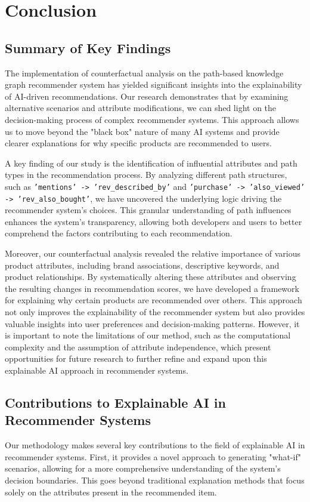 \chapter{Conclusion}\label{chap:conclusion}

\section{Summary of Key Findings}
The implementation of counterfactual analysis on the path-based knowledge graph
recommender system has yielded significant insights into the explainability of
AI-driven recommendations. Our research demonstrates that by examining alternative
scenarios and attribute modifications, we can shed light on the decision-making
process of complex recommender systems. This approach allows us to move beyond the
"black box" nature of many AI systems and provide clearer explanations for why specific
products are recommended to users.

A key finding of our study is the identification of influential attributes and path
types in the recommendation process. By analyzing different path structures, such
as \texttt{'mentions' -> 'rev\_described\_by'} and \texttt{'purchase' -> 'also\_viewed'
-> 'rev\_also\_bought'}, we have uncovered the underlying logic driving the
recommender system's choices. This granular understanding of path influences enhances
the system's transparency, allowing both developers and users to better
comprehend the factors contributing to each recommendation.

Moreover, our counterfactual analysis revealed the relative importance of various
product attributes, including brand associations, descriptive keywords, and
product relationships. By systematically altering these attributes and observing
the resulting changes in recommendation scores, we have developed a framework
for explaining why certain products are recommended over others. This approach not
only improves the explainability of the recommender system but also provides valuable
insights into user preferences and decision-making patterns. However, it is important
to note the limitations of our method, such as the computational complexity and
the assumption of attribute independence, which present opportunities for future
research to further refine and expand upon this explainable AI approach in recommender
systems.

\section{Contributions to Explainable AI in Recommender Systems}
Our methodology makes several key contributions to the field of explainable AI in
recommender systems. First, it provides a novel approach to generating "what-if"
scenarios, allowing for a more comprehensive understanding of the system's
decision boundaries. This goes beyond traditional explanation methods that focus
solely on the attributes present in the recommended item.

